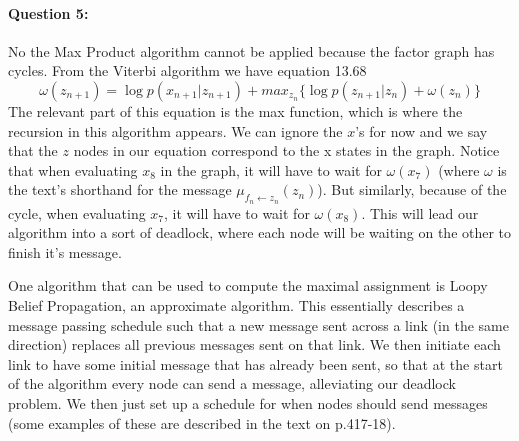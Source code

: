 \documentclass[letterpaper,11pt]{article}
\begin{document}
\paragraph{Question 5:}
No the Max Product algorithm cannot be applied because the factor graph has cycles. From the Viterbi algorithm
we have equation 13.68
\begin{equation}
    \omega(z_{n+1}) = \log p(x_{n+1} | z_{n+1}) + max_{z_n} \{\log p(z_{n+1} | z_n) + \omega(z_n)\}
\end{equation}
The relevant part of this equation is the max function, which is where the recursion in this algorithm
appears. We can ignore the $x$'s for now and we say that the $z$ nodes in our equation correspond to the
x states in the graph. Notice that when evaluating $x_8$ in the graph, it will have to wait for
$\omega(x_7)$ (where $\omega$ is the text's shorthand for the message $\mu_{f_n \leftarrow z_n} (z_n)$).
But similarly, because of the cycle, when evaluating $x_7$, it will have to wait for $\omega(x_8)$. This
will lead our algorithm into a sort of deadlock, where each node will be waiting on the other to finish
it's message.

One algorithm that can be used to compute the maximal assignment is Loopy Belief Propagation, an
approximate algorithm. This essentially describes a message passing schedule such that a new message
sent across a link (in the same direction) replaces all previous messages sent on that link. We then initiate each link
to have some initial message that has already been sent, so that at the start of the algorithm every node
can send a message, alleviating our deadlock problem. We then just set up a schedule for when nodes
should send messages (some examples of these are described in the text on p.417-18).
\end{document}
